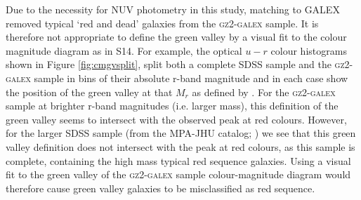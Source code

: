Due to the necessity for NUV photometry in this study, matching to GALEX removed typical `red and dead' galaxies from the \textsc{gz2-galex} sample. It is therefore not appropriate to define the green valley by a visual fit to the  colour magnitude diagram as in S14. For example, the optical $u-r$ colour histograms shown in Figure \ref{fig:cmgvsplit}, split both a complete SDSS sample and the \textsc{gz2-galex} sample in bins of their absolute r-band magnitude and in each case show the position of the green valley at that $M_r$ as defined by \citet{Baldry04}. For the \textsc{gz2-galex} sample at brighter r-band magnitudes (i.e. larger mass), this definition of the green valley seems to intersect with the observed peak at red colours. However, for the larger SDSS sample (from the MPA-JHU catalog; \citealt{kauffmann03, brinchmann04}) we see that this green valley definition does not intersect with the peak at red colours, as this sample is complete, containing the high mass typical red sequence galaxies. Using a visual fit to the green valley of the \textsc{gz2-galex} sample colour-magnitude diagram would therefore cause green valley galaxies to be misclassified as red sequence.


